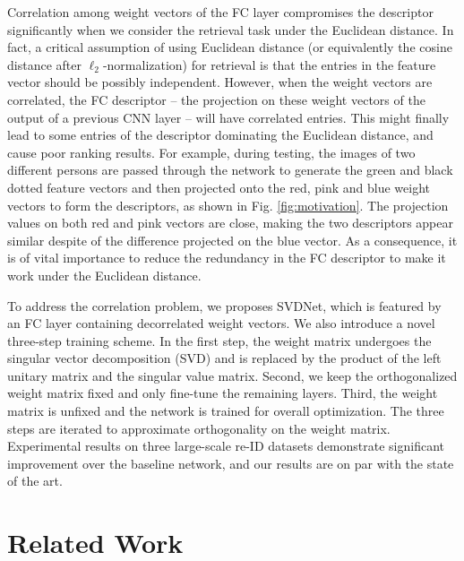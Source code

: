 \documentclass[10pt,twocolumn,letterpaper]{article}
\begin{document}
Correlation among weight vectors of the FC layer compromises the descriptor significantly when we consider the retrieval task under the Euclidean distance. In fact, a critical assumption of using Euclidean distance (or equivalently the cosine distance after $\ell_2$-normalization) for retrieval is that the entries in the feature vector should be possibly independent. However, when the weight vectors are correlated, the FC descriptor -- the projection on these weight vectors of the output of a previous CNN layer --  will have correlated entries. This might finally lead to some entries of the descriptor dominating the Euclidean distance, and cause poor ranking results. For example, during testing, the images of two different persons are passed through the network to generate the green and black dotted feature vectors and then projected onto the red, pink and blue weight vectors to form the descriptors, as shown in Fig. \ref{fig:motivation}. The projection values on both red and pink vectors are close, making the two descriptors appear similar despite of the difference projected on the blue vector. As a consequence, it is of vital importance to reduce the redundancy in the FC descriptor to make it work under the Euclidean distance.

To address the correlation problem, we proposes SVDNet, which is featured by an FC layer containing decorrelated weight vectors. We also introduce a novel three-step training scheme. In the first step, the weight matrix undergoes the singular vector decomposition (SVD) and is replaced by the product of the left unitary matrix and the singular value matrix. Second, we keep the orthogonalized weight matrix fixed and only fine-tune the remaining layers. Third, the weight matrix is unfixed and the network is trained for overall optimization. The three steps are iterated to approximate orthogonality on the weight matrix. Experimental results on three large-scale re-ID datasets demonstrate significant improvement over the baseline network, and our results are on par with the state of the art.

\section{Related Work}
\end{document}
